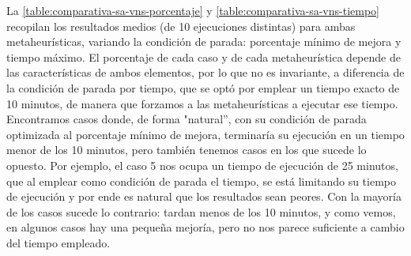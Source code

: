 La \autoref{table:comparativa-sa-vns-porcentaje} y \ref{table:comparativa-sa-vns-tiempo} recopilan los resultados medios (de 10 ejecuciones distintas) para ambas metaheurísticas, variando la condición de parada: porcentaje mínimo de mejora y tiempo máximo. El porcentaje de cada caso y de cada metaheurística depende de las características de ambos elementos, por lo que no es invariante, a diferencia de la condición de parada por tiempo, que se optó por emplear un tiempo exacto de 10 minutos, de manera que forzamos a las metaheurísticas a ejecutar ese tiempo. Encontramos casos donde, de forma "natural'', con su condición de parada optimizada al porcentaje mínimo de mejora, terminaría su ejecución en un tiempo menor de los 10 minutos, pero también tenemos casos en los que sucede lo opuesto. Por ejemplo, el caso 5 nos ocupa un tiempo de ejecución de 25 minutos, que al emplear como condición de parada el tiempo, se está limitando su tiempo de ejecución y por ende es natural que los resultados sean peores. Con la mayoría de los casos sucede lo contrario: tardan menos de los 10 minutos, y como vemos, en algunos casos hay una pequeña mejoría, pero no nos parece suficiente a cambio del tiempo empleado.

